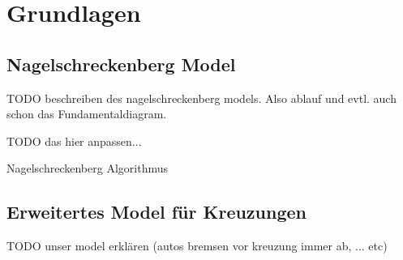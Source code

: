 \chapter{Grundlagen}

\section{Nagelschreckenberg Model}
TODO beschreiben des nagelschreckenberg models.
Also ablauf und evtl. auch schon das Fundamentaldiagram.

TODO das hier anpassen...

\begin{algorithm}[H]

 \caption{Nagelschreckenberg Algorithmus}
 \label{algo:nagelsberg}
\end{algorithm}

\section{Erweitertes Model für Kreuzungen} \label{sec:erwmodel}
TODO unser model erklären (autos bremsen vor kreuzung immer ab,
... etc)
